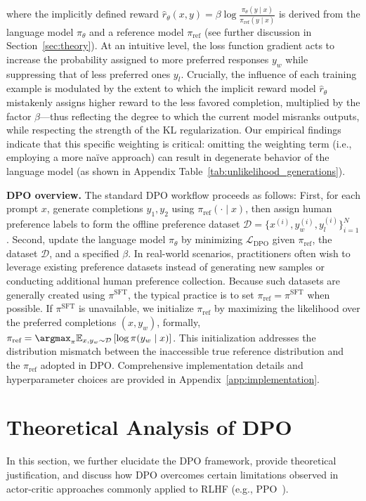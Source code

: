 where the implicitly defined reward $\hat{r}_\theta(x, y) = \beta \log \frac{\pi_\theta(y \mid x)}{\pi_\text{ref}(y \mid x)}$ is derived from the language model $\pi_\theta$ and a reference model $\pi_\text{ref}$ (see further discussion in Section~\ref{sec:theory}). At an intuitive level, the loss function gradient acts to increase the probability assigned to more preferred responses $y_w$ while suppressing that of less preferred ones $y_l$. Crucially, the influence of each training example is modulated by the extent to which the implicit reward model $\hat{r}_\theta$ mistakenly assigns higher reward to the less favored completion, multiplied by the factor $\beta$—thus reflecting the degree to which the current model misranks outputs, while respecting the strength of the KL regularization. Our empirical findings indicate that this specific weighting is critical: omitting the weighting term (i.e., employing a more naïve approach) can result in degenerate behavior of the language model (as shown in Appendix Table~\ref{tab:unlikelihood_generations}).

\textbf{DPO overview.} The standard DPO workflow proceeds as follows: First, for each prompt $x$, generate completions $y_1, y_2$ using $\pi_\text{ref}(\cdot \mid x)$, then assign human preference labels to form the offline preference dataset $\mathcal{D} = \{x^{(i)}, y_w^{(i)}, y_l^{(i)}\}_{i=1}^N$. Second, update the language model $\pi_\theta$ by minimizing $\mathcal{L}_\text{DPO}$ given $\pi_\text{ref}$, the dataset $\mathcal{D}$, and a specified $\beta$. In real-world scenarios, practitioners often wish to leverage existing preference datasets instead of generating new samples or conducting additional human preference collection. Because such datasets are generally created using $\pi^\text{SFT}$, the typical practice is to set $\pi_\text{ref} = \pi^\text{SFT}$ when possible. If $\pi^\text{SFT}$ is unavailable, we initialize $\pi_\text{ref}$ by maximizing the likelihood over the preferred completions ${(x, y_w)}$, formally, ${\pi_\text{ref} = \argmax_{\pi}\mathbb{E}_{x, y_w \sim \mathcal{D}}\left[\log \pi(y_w \mid x)\right]}$. This initialization addresses the distribution mismatch between the inaccessible true reference distribution and the $\pi_\text{ref}$ adopted in DPO. Comprehensive implementation details and hyperparameter choices are provided in Appendix~\ref{app:implementation}.

\section{Theoretical Analysis of DPO} In this section, we further elucidate the DPO framework, provide theoretical justification, and discuss how DPO overcomes certain limitations observed in actor-critic approaches commonly applied to RLHF (e.g., PPO~\cite{schulman2017proximal}).

